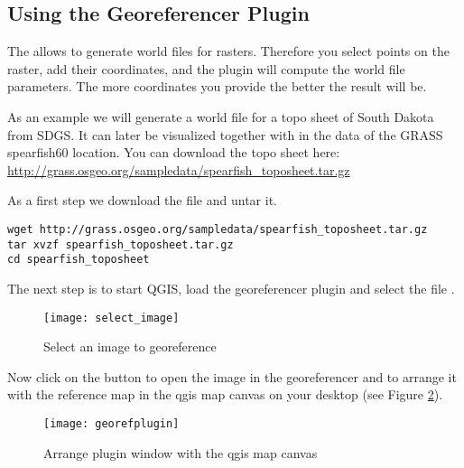 \subsection{Using the Georeferencer Plugin}

\updatedisclaimer

The  allows to generate world files for rasters.
Therefore you select points on the raster, add their coordinates, and the plugin will compute the world file parameters.
The more coordinates you provide the better the result will be.

As an example we will generate a world file for a topo sheet of South Dakota from SDGS.
It can later be visualized together with in the data of the GRASS spearfish60 location.
You can download the topo sheet here: \url{http://grass.osgeo.org/sampledata/spearfish\_toposheet.tar.gz}

As a first step we download the file and untar it.

\begin{verbatim}
wget http://grass.osgeo.org/sampledata/spearfish_toposheet.tar.gz
tar xvzf spearfish_toposheet.tar.gz
cd spearfish_toposheet
\end{verbatim}

The next step is to start QGIS, load the georeferencer plugin and select the file .

\begin{figure}[ht]
\begin{center}
\caption{Select an image to georeference \nixcaption}\label{fig:select_image}\smallskip
  \texttt{[image: select\_image]}
\end{center}
\end{figure}

Now click on the button  to open the image in
the georeferencer and to arrange it with the reference map in the qgis map
canvas on your desktop (see Figure \ref{fig:georefplugin}).

\begin{figure}[ht]
\begin{center}
  \caption{Arrange plugin window with the qgis map canvas \nixcaption}\label{fig:georefplugin}\smallskip
  \texttt{[image: georefplugin]}
\end{center}
\end{figure}

